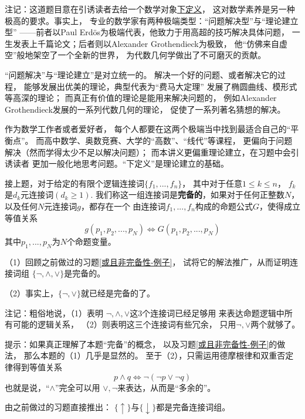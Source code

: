 注记：这道题目意在引诱读者去给一个数学对象\underline{下定义}，
这对数学素养是另一种极高的要求。事实上，
专业的数学家有两种极端类型：“问题解决型”与“理论建立型”
——前者以Paul Erd\"{o}s为极端代表，他致力于用高超的技巧解决具体问题，
一生发表上千篇论文；后者则以Alexander Grothendieck为极致，
他“仿佛来自虚空”般地架空了一个全新的世界，
为代数几何学做出了不可磨灭的贡献。

“问题解决”与“理论建立”是对立统一的。
解决一个好的问题、或者解决它的过程，
能够发展出优美的理论，典型代表为“费马大定理”
发展了椭圆曲线、模形式等高深的理论；
而真正有价值的理论是能用来解决问题的，
例如Alexander Grothendieck发展的一系列代数几何的理论，
促使了一系列著名猜想的解决。

作为数学工作者或者爱好者，
每个人都要在这两个极端当中找到最适合自己的“平衡点”。
而高中数学、奥数竞赛、大学的“高数”、“线代”等课程，
更偏向于问题解决（然而学得太少不足以解决问题）；
而本讲义更偏重理论建立，在习题中会引诱读者
更加一般化地思考问题。“下定义”是理论建立的基础。\vs

\begin{prob}[完备连接词组]
接上题，对于给定的有限个逻辑连接词$\{f_1,...,f_n\}$，
其中对于任意$1\leq k\leq n$，
$f_k$是$d_k$元连接词$(d_k\geq 1)$.
我们称这一组连接词是\textbf{完备的}，如果对于任何正整数$N$，
以及任何$N$元连接词$g$，都存在一个
由连接词$f_1,...,f_n$构成的命题公式$G$，使得成立等值关系
$$g(p_1,p_2,...,p_N)\Leftrightarrow G(p_1,p_2,...,p_N)$$
其中$p_1,...,p_N$为$N$个命题变量。

（1）回顾之前做过的习题\ref{或且非完备性-例子}，
试将它的解法推广，从而证明连接词组
$\{\neg,\wedge,\vee\}$是完备的。

（2）事实上，$\{\neg,\vee\}$就已经是完备的了。
\end{prob}

注记：粗俗地说，（1）表明
$\neg,\wedge,\vee$这3个连接词已经足够用
来表达命题逻辑中所有可能的逻辑关系，
（2）则表明这三个连接词有些冗余，
只用$\neg,\vee$两个就够了。\vs

提示：如果真正理解了本题“完备”的概念，
以及习题\ref{或且非完备性-例子}的做法，
那么本题的（1）几乎是显然的。
至于（2），只需运用德摩根律和双重否定律得到等值关系
$$p\wedge q\Leftrightarrow\neg(\neg p\vee\neg q)$$
也就是说，“$\wedge$”完全可以用
$\vee,\neg$来表达，从而是“多余的”。\vs

\begin{prob}
由之前做过的习题直接推出：
$\{\uparrow\}$与$\{\downarrow\}$都是完备连接词组。
\end{prob}

